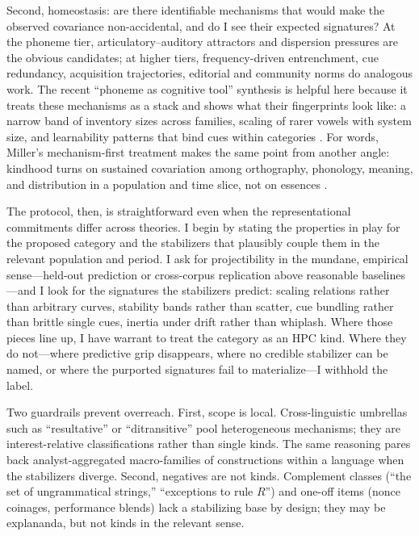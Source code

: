 \documentclass[12pt]{article}
\begin{document}
Second, homeostasis: are there identifiable mechanisms that would make the observed covariance non-accidental, and do I see their expected signatures? At the phoneme tier, articulatory–auditory attractors and dispersion pressures are the obvious candidates; at higher tiers, frequency-driven entrenchment, cue redundancy, acquisition trajectories, editorial and community norms do analogous work. The recent “phoneme as cognitive tool” synthesis is helpful here because it treats these mechanisms as a stack and shows what their fingerprints look like: a narrow band of inventory sizes across families, scaling of rarer vowels with system size, and learnability patterns that bind cues within categories \citep[Fig.\,1; Fig.\,2; Table~1]{Ekstrom2025PhonemeTool}. For words, Miller’s mechanism-first treatment makes the same point from another angle: kindhood turns on sustained covariation among orthography, phonology, meaning, and distribution in a population and time slice, not on essences \citep{Miller2021WordsSpeciesKinds}.

The protocol, then, is straightforward even when the representational commitments differ across theories. I begin by stating the properties in play for the proposed category and the stabilizers that plausibly couple them in the relevant population and period. I ask for projectibility in the mundane, empirical sense—held-out prediction or cross-corpus replication above reasonable baselines—and I look for the signatures the stabilizers predict: scaling relations rather than arbitrary curves, stability bands rather than scatter, cue bundling rather than brittle single cues, inertia under drift rather than whiplash. Where those pieces line up, I have warrant to treat the category as an \textsc{HPC} kind. Where they do not—where predictive grip disappears, where no credible stabilizer can be named, or where the purported signatures fail to materialize—I withhold the label.

Two guardrails prevent overreach. First, scope is local. Cross-linguistic umbrellas such as “resultative” or “ditransitive” pool heterogeneous mechanisms; they are interest-relative classifications rather than single kinds. The same reasoning pares back analyst-aggregated macro-families of constructions within a language when the stabilizers diverge. Second, negatives are not kinds. Complement classes (“the set of ungrammatical strings,” “exceptions to rule $R$”) and one-off items (nonce coinages, performance blends) lack a stabilizing base by design; they may be explananda, but not kinds in the relevant sense.
\end{document}
